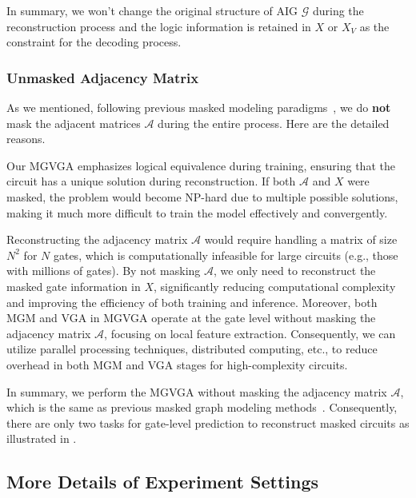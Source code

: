 In summary, we won't change the original structure of AIG $\mathcal{G}$ during the reconstruction process and the logic information is retained in $X$ or $X_V$ as the constraint for the decoding process.


\subsubsection{Unmasked Adjacency Matrix}
\label{sec:womasking}
As we mentioned, following previous masked modeling paradigms~\citep{hou2022graphmae, hou2023graphmae2}, we do \textbf{not} mask the adjacent matrices $\mathcal{A}$ during the entire process.
Here are the detailed reasons.

Our MGVGA emphasizes logical equivalence during training, ensuring that the circuit has a unique solution during reconstruction. 
If both $ \mathcal{A} $ and $X$ were masked, the problem would become NP-hard due to multiple possible solutions, making it much more difficult to train the model effectively and convergently.

Reconstructing the adjacency matrix $\mathcal{A}$ would require handling a matrix of size $N^2$ for $N$ gates, which is computationally infeasible for large circuits (e.g., those with millions of gates).
By not masking $\mathcal{A}$, we only need to reconstruct the masked gate information in $X$, significantly reducing computational complexity and improving the efficiency of both training and inference.
Moreover, both MGM and VGA in MGVGA operate at the gate level without masking the adjacency matrix $\mathcal{A}$, focusing on local feature extraction. 
Consequently, we can utilize parallel processing techniques, distributed computing, etc., to reduce overhead in both MGM and VGA stages for high-complexity circuits.

In summary, we perform the MGVGA without masking the adjacency matrix $\mathcal{A}$, which is the same as previous masked graph modeling methods~\citep{hou2022graphmae, hou2023graphmae2}. 
Consequently, there are only two tasks for gate-level prediction to reconstruct masked circuits as illustrated in . 

\subsection{More Details of Experiment Settings}

